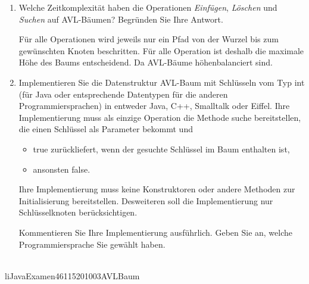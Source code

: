 \documentclass{lehramt-informatik-aufgabe}
\begin{document}
\begin{enumerate}
\begin{liAntwort}
\begin{liDiagramm}{Nach Einfügen von „3“}
\end{liDiagramm}
\end{liAntwort}

\item Welche Zeitkomplexität haben die Operationen \emph{Einfügen},
\emph{Löschen} und \emph{Suchen} auf AVL-Bäumen? Begründen Sie Ihre
Antwort.

\begin{liAntwort}
Für alle Operationen wird jeweils nur ein Pfad von der Wurzel bis zum
gewünschten Knoten beschritten. Für alle Operation ist deshalb die
maximale Höhe des Baums entscheidend. Da AVL-Bäume höhenbalanciert sind.

\end{liAntwort}

\item Implementieren Sie die Datenstruktur AVL-Baum mit Schlüsseln vom
Typ int (für Java oder entsprechende Datentypen für die anderen
Programmiersprachen) in entweder Java, C++, Smalltalk oder Eiffel. Ihre
Implementierung muss als einzige Operation die Methode suche
bereitstellen, die einen Schlüssel als Parameter bekommt und

\begin{itemize}
\item true zurückliefert, wenn der gesuchte Schlüssel im Baum enthalten
ist,

\item ansonsten false.
\end{itemize}

Ihre Implementierung muss keine Konstruktoren oder andere Methoden zur
Initialisierung bereitstellen. Desweiteren soll die Implementierung nur
Schlüsselknoten berücksichtigen.

Kommentieren Sie Ihre Implementierung ausführlich. Geben Sie an, welche
Programmiersprache Sie gewählt haben.
\end{enumerate}

\\liJavaExamen{46115}{2010}{03}{AVLBaum}
\end{document}
